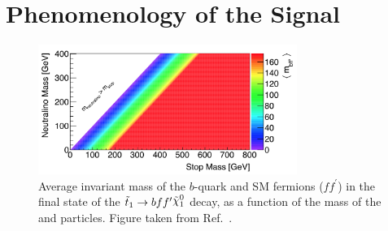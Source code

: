 \section{Phenomenology of the Signal}
\label{sec:stop_pheno}

\begin{figure}[!htb]
    \begin{center}
        \includegraphics[width=0.75\textwidth]{figures/search_stop2l/nachman_stop_phase_space}
        \caption{
            Average invariant mass of the $b$-quark and SM fermions ($f f^{\prime}$) in the
            final state of the $\stopone \rightarrow b f f^{\prime} \ninoone$ decay, as a function of the mass
            of the \stopone and \ninoone particles.
            Figure taken from Ref.~\cite{Nachman:2016qyc}.
        }
        \label{fig:stop_phase_space}
    \end{center}
\end{figure}
